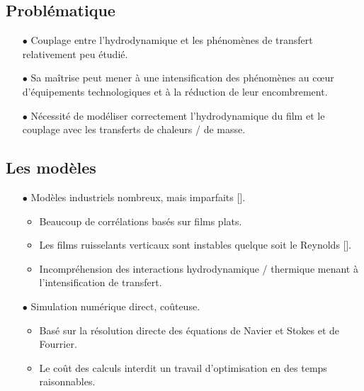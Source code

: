 \documentclass[a0,portrait]{a0poster}
\begin{document}
\begin{multicols}{2}
    \columnbreak

    \section*{Problématique}
    \begin{itemize}
    	\item[$\bullet$] Couplage entre l'hydrodynamique et les phénomènes de transfert relativement peu étudié.
    	\item[$\bullet$] Sa maîtrise peut mener à une intensification des phénomènes au cœur d'équipements technologiques et à la réduction de leur encombrement.
    	\item[$\bullet$] Nécessité de modéliser correctement l'hydrodynamique du film et le couplage avec les transferts de chaleurs / de masse.
    \end{itemize}

    \subsection*{Les modèles}
    \begin{itemize}
	    \item[$\bullet$] Modèles industriels nombreux, mais imparfaits [\cite{Killion2001}].
    	\begin{itemize}
    		\item Beaucoup de corrélations basés sur films plats.
    		\item Les films ruisselants verticaux sont instables quelque soit le Reynolds [\textcite{Miller1998a}].
    		\item Incompréhension des interactions hydrodynamique / thermique menant à l'intensification de transfert.
    	\end{itemize}
	    \item[$\bullet$] Simulation numérique direct, coûteuse.
    	\begin{itemize}
    		\item Basé sur la résolution directe des équations de Navier et Stokes et de Fourrier.
    		\item Le coût des calculs interdit un travail d'optimisation en des temps raisonnables.
    	\end{itemize}
        \color{DarkRed}{
	    \item[$\bullet$] Modèles asymptotiques (méthode retenue).
    	\begin{itemize}
    		\item Basé un développement en couche limite adapté aux films ruisselants.
    		\item Limité à un domaine de paramètres restreints (faible Reynolds).
    		\item Travail important sur les équations en amont.
    	\end{itemize}
        }
    \end{itemize}
\end{multicols}
\end{document}
